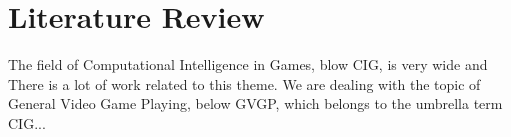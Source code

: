 \section{Literature Review} \label{sec:lit}

The field of Computational Intelligence in Games, blow CIG, is very wide and There is a lot of work related  to this theme. We are dealing with the topic of General Video Game Playing, below GVGP, which belongs to the umbrella term CIG...